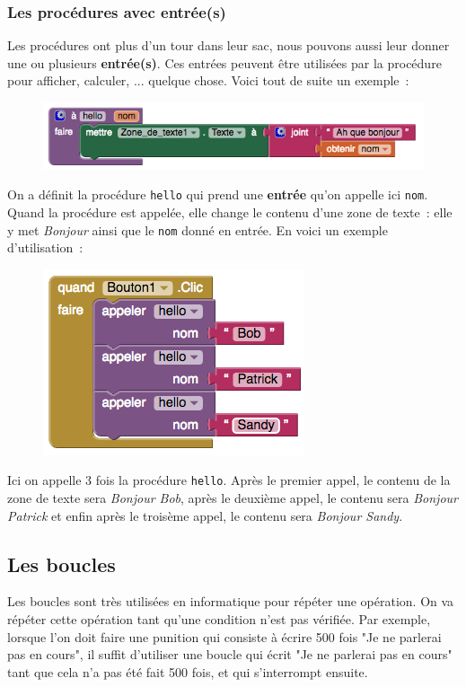 \documentclass[12t,a4paper]{article}
\begin{document}
\subsubsection{Les procédures avec entrée(s)}

Les procédures ont plus d'un tour dans leur sac, nous pouvons aussi leur donner une ou plusieurs \textbf{entrée(s)}. Ces entrées peuvent être utilisées par la procédure pour afficher, calculer, ... quelque chose. Voici tout de suite un exemple~:

\begin{figure}[h!]
\centering
\includegraphics[scale=0.6]{exemple-proc-entry}
\end{figure}

On a définit la procédure \texttt{hello} qui prend une \textbf{entrée} qu'on appelle ici \texttt{nom}. Quand la procédure est appelée, elle change le contenu d'une zone de texte~: elle y met \textit{Bonjour} ainsi que le \texttt{nom} donné en entrée. En voici un exemple d'utilisation~:

\begin{figure}[h!]
\centering
\includegraphics[scale=0.6]{exemple-proc-entry-call}
\end{figure}

Ici on appelle 3 fois la procédure \texttt{hello}. Après le premier appel, le contenu de la zone de texte sera \textit{Bonjour Bob}, après le deuxième appel, le contenu sera \textit{Bonjour Patrick} et enfin après le troisème appel, le contenu sera \textit{Bonjour Sandy}.

\clearpage
\subsection{Les boucles}
Les boucles sont très utilisées en informatique pour répéter une opération. On va répéter cette opération tant qu'une condition n'est pas vérifiée. Par exemple, lorsque l'on doit faire une punition qui consiste à écrire 500 fois "Je ne parlerai pas en cours", il suffit d'utiliser une boucle qui écrit "Je ne parlerai pas en cours" tant que cela n'a pas été fait 500 fois, et qui s'interrompt ensuite.\\
\end{document}
